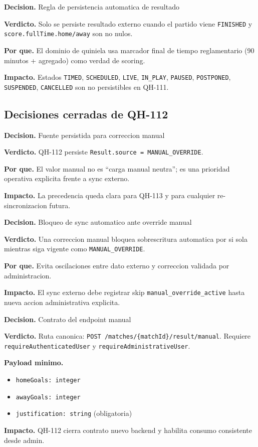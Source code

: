 \begin{docnote}
\textbf{Decision.} Regla de persistencia automatica de resultado

\textbf{Verdicto.} Solo se persiste resultado externo cuando el partido viene \texttt{FINISHED} y \texttt{score.fullTime.home/away} son no nulos.

\textbf{Por que.} El dominio de quiniela usa marcador final de tiempo reglamentario (90 minutos + agregado) como verdad de scoring.

\textbf{Impacto.} Estados \texttt{TIMED}, \texttt{SCHEDULED}, \texttt{LIVE}, \texttt{IN\_PLAY}, \texttt{PAUSED}, \texttt{POSTPONED}, \texttt{SUSPENDED}, \texttt{CANCELLED} son no persistibles en QH-111.
\end{docnote}

\subsection{Decisiones cerradas de QH-112}

\begin{docnote}
\textbf{Decision.} Fuente persistida para correccion manual

\textbf{Verdicto.} QH-112 persiste \texttt{Result.source = MANUAL\_OVERRIDE}.

\textbf{Por que.} El valor manual no es ``carga manual neutra''; es una prioridad operativa explicita frente a sync externo.

\textbf{Impacto.} La precedencia queda clara para QH-113 y para cualquier re-sincronizacion futura.
\end{docnote}

\begin{docnote}
\textbf{Decision.} Bloqueo de sync automatico ante override manual

\textbf{Verdicto.} Una correccion manual bloquea sobrescritura automatica por si sola mientras siga vigente como \texttt{MANUAL\_OVERRIDE}.

\textbf{Por que.} Evita oscilaciones entre dato externo y correccion validada por administracion.

\textbf{Impacto.} El sync externo debe registrar skip \texttt{manual\_override\_active} hasta nueva accion administrativa explicita.
\end{docnote}

\begin{docnote}
\textbf{Decision.} Contrato del endpoint manual

\textbf{Verdicto.} Ruta canonica: \texttt{POST /matches/\{matchId\}/result/manual}. Requiere \texttt{requireAuthenticatedUser} y \texttt{requireAdministrativeUser}.

\textbf{Payload minimo.}
\begin{itemize}
  \item \texttt{homeGoals: integer}
  \item \texttt{awayGoals: integer}
  \item \texttt{justification: string} (obligatoria)
\end{itemize}

\textbf{Impacto.} QH-112 cierra contrato nuevo backend y habilita consumo consistente desde admin.
\end{docnote}

